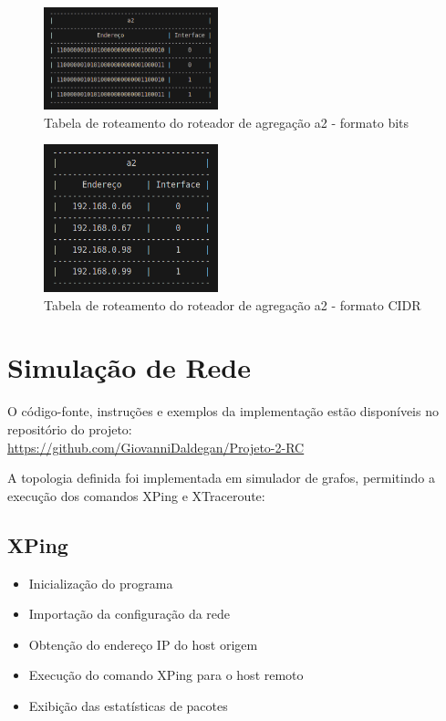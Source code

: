 \documentclass[conference,compsoc]{IEEEtran}
\begin{document}
\begin{otherlanguage}{brazil}
\begin{figure}[h]
\centering
\includegraphics[width=0.45\textwidth]{../media/bits a2.png}
\caption{Tabela de roteamento do roteador de agregação a2 - formato bits}
\end{figure}

\begin{figure}[h]
\centering
\includegraphics[width=0.45\textwidth]{../media/cidr a2.png}
\caption{Tabela de roteamento do roteador de agregação a2 - formato CIDR}
\end{figure}

\newpage
\section{Simulação de Rede}

O código-fonte, instruções e exemplos da implementação estão disponíveis no repositório do projeto: \\ 
\url{https://github.com/GiovanniDaldegan/Projeto-2-RC}

A topologia definida foi implementada em simulador de grafos, permitindo a execução dos comandos XPing e XTraceroute:

\subsection{XPing}
\begin{itemize}
    \item Inicialização do programa
    \item Importação da configuração da rede
    \item Obtenção do endereço IP do host origem
    \item Execução do comando XPing para o host remoto
    \item Exibição das estatísticas de pacotes
\end{itemize}


\end{otherlanguage}
\end{document}
